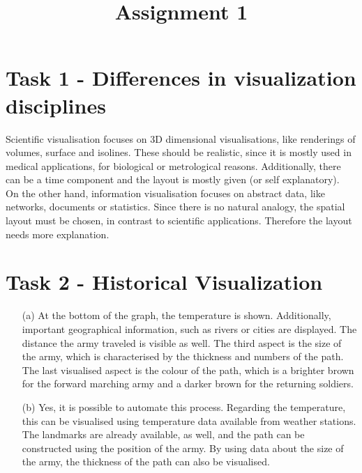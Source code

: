 \documentclass[a4paper]{article}
\date{}
\author{}
\title{Assignment 1}
\begin{document}
	\maketitle 
	\thispagestyle{fancy}
	
	\section*{Task 1 - Differences in visualization disciplines}
	
	Scientific visualisation focuses on 3D dimensional visualisations, like renderings of volumes, surface and isolines. 
	These should be realistic, since it is mostly used in medical applications, for biological or metrological reasons. 
	Additionally, there can be a time component and the layout is mostly given (or self explanatory).\\ \linebreak
	On the other hand, information visualisation focuses on abstract data, like networks, documents or statistics. 
	Since there is no natural analogy, the spatial layout must be chosen, in contrast to scientific applications. 
	Therefore the layout needs more explanation. 
	
	
	\section*{Task 2 - Historical Visualization}
	
	\begin{enumerate}
		\item[(a)] At the bottom of the graph, the temperature is shown. 
		Additionally, important geographical information, such as rivers or cities are displayed. The distance the army traveled is visible as well. 
		The third aspect is the size of the army, which is characterised by the thickness and numbers of the path. 
		The last  visualised aspect is the colour of the path, which is a brighter brown for the forward marching army and a darker brown for the returning soldiers. 
		\item[(b)] Yes, it is possible to automate this process. 
		Regarding the temperature, this can be visualised using temperature data available from weather stations.
		The landmarks are already available, as well, and the path can be constructed using the position of the army. 
		By using data about the size of the army, the thickness of the path can also be visualised. 
	\end{enumerate}
	
	\newpage
\end{document}
